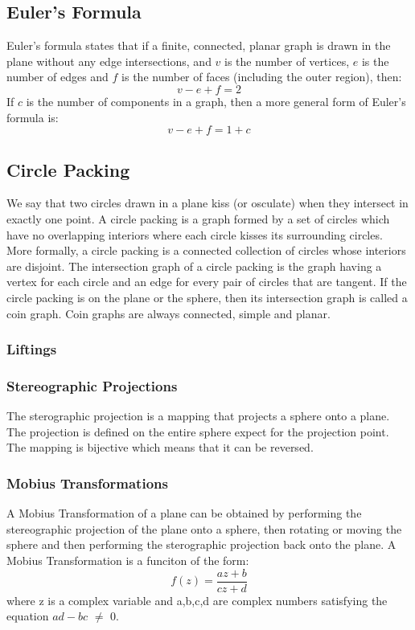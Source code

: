 \documentclass{article}
\begin{document}
\subsection{Euler's Formula}
Euler's formula states that if a finite, connected, planar graph is drawn in the plane without any edge intersections, and $v$ is the number of vertices, $e$ is the number of edges and $f$ is the number of faces (including the outer region), then: 
\begin{equation} 
v-e+f=2
\end{equation}
If $c$ is the number of components in a graph, then a more general form of Euler's formula is:
\begin{equation} 
v-e+f= 1 + c
\end{equation}
\subsection{Circle Packing}
We say that two circles drawn in a plane kiss (or osculate) when they intersect in exactly one point. A circle packing is a graph formed by a set of circles which have no overlapping interiors where each circle kisses its surrounding circles. More formally, a circle packing is a connected collection of circles whose interiors are disjoint. The intersection graph of a circle packing is the graph having a vertex for each circle and an edge for every pair of circles that are tangent. If the circle packing is on the plane or the sphere, then its intersection graph is called a coin graph. Coin graphs are always connected, simple and planar. \subsubsection{Liftings}
\subsubsection{Stereographic Projections}
The sterographic projection is a mapping that projects a sphere onto a plane. The projection is defined on the entire sphere expect for the projection point. The mapping is bijective which means that it can be reversed.
\subsubsection{Mobius Transformations}
A Mobius Transformation of a plane can be obtained by performing the stereographic projection of the plane onto a sphere, then rotating or moving the sphere and then performing the sterographic projection back onto the plane. A Mobius Transformation is a funciton of the form:
\begin{equation} 
f(z) = \frac{az+b}{cz+d}
\end{equation}
where z is a complex variable and a,b,c,d are complex numbers satisfying the equation $ad - bc$ $\neq$ $0$.
\end{document}
